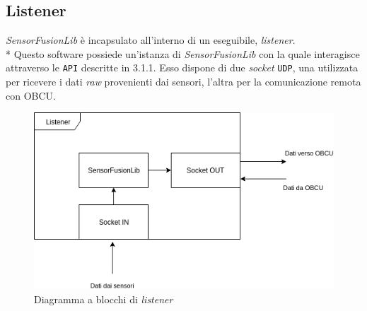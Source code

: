 \subsection{Listener}
\textit{SensorFusionLib} \`e incapsulato all'interno di un eseguibile, \textit{listener}.\\*
Questo software possiede un'istanza di \textit{SensorFusionLib} con la quale interagisce attraverso le \texttt{API} descritte in 3.1.1. Esso dispone di due \textit{socket} \texttt{UDP}, una utilizzata per ricevere i dati \textit{raw} provenienti dai sensori, l'altra per la comunicazione remota con OBCU.
\begin{figure}[h]
	\centering
	\includegraphics[width=0.7\linewidth]{img/ListenerOK}
	\caption{Diagramma a blocchi di \emph{listener}}
	\label{fig:listener}
\end{figure}
